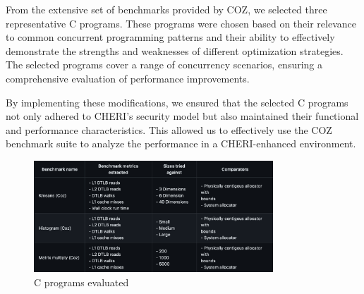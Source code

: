 From the extensive set of benchmarks provided by COZ, we selected three representative C programs. 
These programs were chosen based on their relevance to common concurrent programming patterns and
their ability to effectively demonstrate the strengths and weaknesses of different optimization 
strategies. The selected programs cover a range of concurrency scenarios, ensuring a comprehensive
evaluation of performance improvements.

By implementing these modifications, we ensured that the selected C programs not only adhered to
CHERI's security model but also maintained their functional and performance characteristics. 
This allowed us to effectively use the COZ benchmark suite to analyze the performance in a CHERI-enhanced environment.

\begin{figure}[h]
  \includegraphics[width=0.8\textwidth]{diagrams/expirement-runs.png}
  \caption{C programs evaluated}
\end{figure}

